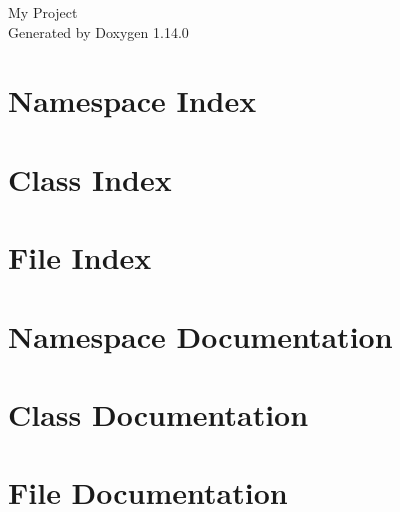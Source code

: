 \documentclass[twoside]{book}
\newcommand{\+}{\discretionary{\mbox{\scriptsize$\hookleftarrow$}}{}{}}
\newcommand{\clearemptydoublepage}{%
    \newpage{\pagestyle{empty}\cleardoublepage}%
  }
\begin{document}
  \raggedbottom
    \hypersetup{pageanchor=false,
                bookmarksnumbered=true,
                pdfencoding=unicode
               }
  \begin{titlepage}
  \vspace*{7cm}
  \begin{center}%
  {\Large My Project}\\
  \vspace*{1cm}
  {\large Generated by Doxygen 1.14.0}\\
  \end{center}
  \end{titlepage}
  \clearemptydoublepage
  \tableofcontents
  \clearemptydoublepage
  \hypersetup{pageanchor=true}
\chapter{Namespace Index}

\chapter{Class Index}

\chapter{File Index}

\chapter{Namespace Documentation}

\chapter{Class Documentation}






\chapter{File Documentation}


























  \backmatter
  \newpage
  \clearemptydoublepage
  \printindex
\end{document}
